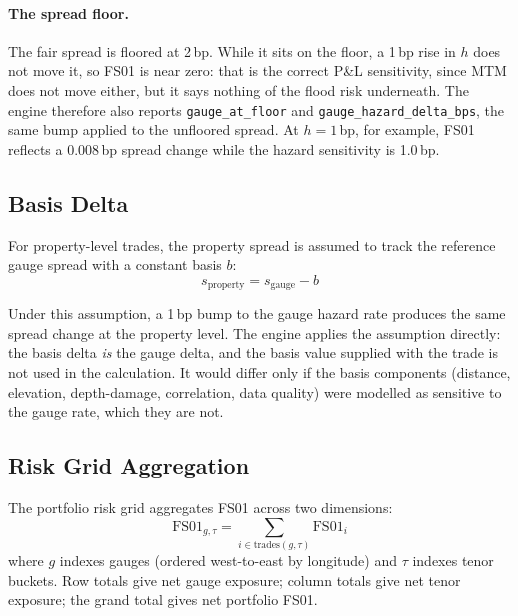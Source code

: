 \documentclass[11pt,a4paper]{article}
\begin{document}
\paragraph{The spread floor.} The fair spread is floored at 2\,bp. While it sits on the
floor, a 1\,bp rise in $h$ does not move it, so FS01 is near zero: that is the correct
P\&L sensitivity, since MTM does not move either, but it says nothing of the flood risk
underneath. The engine therefore also reports \texttt{gauge\_at\_floor} and
\texttt{gauge\_hazard\_delta\_bps}, the same bump applied to the unfloored spread. At
$h=1$\,bp, for example, FS01 reflects a 0.008\,bp spread change while the hazard
sensitivity is 1.0\,bp.

\subsection{Basis Delta}

For property-level trades, the property spread is assumed to track the reference gauge spread with a constant basis $b$:
\begin{equation}
    s_{\text{property}} = s_{\text{gauge}} - b
\end{equation}

Under this assumption, a 1\,bp bump to the gauge hazard rate produces the same spread change at the property level. The engine applies the assumption directly: the basis delta \emph{is} the gauge delta, and the basis value supplied with the trade is not used in the calculation. It would differ only if the basis components (distance, elevation, depth-damage, correlation, data quality) were modelled as sensitive to the gauge rate, which they are not.

\subsection{Risk Grid Aggregation}

The portfolio risk grid aggregates FS01 across two dimensions:
\begin{equation}
    \text{FS01}_{g,\tau} = \sum_{i \in \text{trades}(g,\tau)} \text{FS01}_i
\end{equation}
where $g$ indexes gauges (ordered west-to-east by longitude) and $\tau$ indexes tenor buckets. Row totals give net gauge exposure; column totals give net tenor exposure; the grand total gives net portfolio FS01.

\clearpage

\mkminputs
\end{document}
